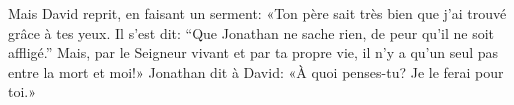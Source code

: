 Mais David reprit, en faisant un serment:
	«Ton père sait très bien que j’ai trouvé grâce à tes yeux.
	Il s’est dit: “Que Jonathan ne sache rien, de peur qu’il ne soit affligé.”
Mais, par le Seigneur vivant et par ta propre vie,
	il n’y a qu’un seul pas entre la mort et moi!»
Jonathan dit à David:
	«À quoi penses-tu?
	Je le ferai pour toi.»
